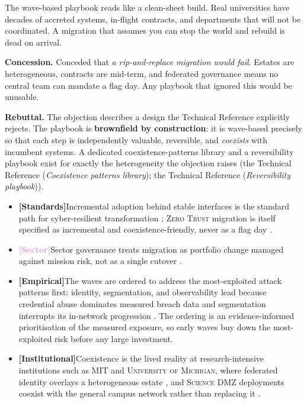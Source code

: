 \documentclass[11pt,a4paper,twoside]{book}
\let\citep\parencite
\newcommand{\keyword}[1]{\textbf{#1}}
\newcommand{\institution}[1]{\textsc{#1}}
\newcommand{\evstd}{\textcolor{NavyBlue}{\textbf{[Standards]}}\space}
\newcommand{\evsector}{\textcolor{Plum}{\textbf{[Sector]}}\space}
\newcommand{\evempirical}{\textcolor{OliveGreen}{\textbf{[Empirical]}}\space}
\newcommand{\evinst}{\textcolor{Slate}{\textbf{[Institutional]}}\space}
\newcommand{\trref}[1]{the Technical Reference (\emph{#1})}
\begin{document}
\begin{questionbox}
The wave-based playbook reads like a clean-sheet build. Real universities
have decades of accreted systems, in-flight contracts, and departments that
will not be coordinated. A migration that assumes you can stop the world and
rebuild is dead on arrival.
\end{questionbox}

\begin{answerbox}[Response O4.1]
\textbf{Concession.} Conceded that \emph{a rip-and-replace migration would
fail}. Estates are heterogeneous, contracts are mid-term, and federated
governance means no central team can mandate a flag day. Any playbook that
ignored this would be unusable.

\medskip
\textbf{Rebuttal.} The objection describes a design the Technical Reference
explicitly rejects. The playbook is \keyword{brownfield by construction}: it
is wave-based precisely so that each step is independently valuable,
reversible, and \emph{coexists} with incumbent systems. A dedicated
coexistence-patterns library and a reversibility playbook exist for exactly
the heterogeneity the objection raises (\trref{Coexistence patterns library};
\trref{Reversibility playbook}).

\begin{itemize}[leftmargin=1.4em,itemsep=2pt]
  \item \evstd Incremental adoption behind stable interfaces is the
        standard path for cyber-resilient transformation
        \citep{nist-sp800-160v2}; \institution{Zero Trust} migration is
        itself specified as incremental and coexistence-friendly, never as
        a flag day \citep{nist-zt}.
  \item \evsector Sector governance treats migration as portfolio change
        managed against mission risk, not as a single cutover
        \citep{cobit,weill-ross,educause-governance}.
  \item \evempirical The waves are ordered to address the most-exploited
        attack patterns first: identity, segmentation, and observability
        lead because credential abuse dominates measured breach data
        \citep{verizon-dbir2024,ibm-cost-breach-2024} and segmentation
        interrupts its in-network progression \citep{nist-sp800-215}.
        The ordering is
        an evidence-informed prioritisation of the measured exposure, so
        early waves buy down the most-exploited risk before any large
        investment.
  \item \evinst Coexistence is the lived reality at research-intensive
        institutions such as \institution{MIT} and
        \institution{University of Michigan}, where federated
        identity overlays a heterogeneous estate \citep{mit-kerberos,umich-its},
        and \institution{Science DMZ} deployments coexist with the general
        campus network rather than replacing it
        \citep{science-dmz-2013,esnet-cases}.
\end{itemize}


\end{answerbox}
\end{document}
